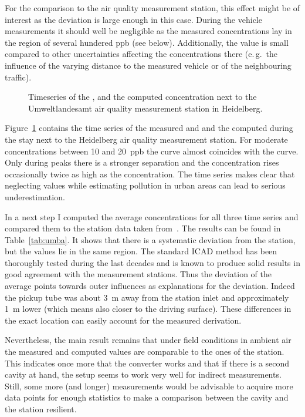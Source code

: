For the comparison to the air quality measurement station, this effect
might be of interest as the deviation is large enough in this
case. During the vehicle measurements it should well be negligible as
the measured concentrations lay in the region of several hundered
\si{ppb} (see below). Additionally, the value is small compared to
other uncertainties affecting the concentrations there (e.\,g.\ the
influence of the varying distance to the measured vehicle or of the
neighbouring traffic).

\begin{figure}[htbp]
  \centering
  
  \caption{Timeseries of the ,  and the computed
     concentration next to the Umweltlandesamt air quality
    measurement station in Heidelberg.}
  \label{fig:umba}
\end{figure}

Figure~\ref{fig:umba} contains the time series of the measured
 and  and the computed  during the stay next
to the Heidelberg air quality measurement station. For moderate
 concentrations between \num{10} and \SI{20}{ppb} the
 curve almost coincides with the  curve. Only during
peaks there is a stronger separation and the  concentration
rises occasionally twice as high as the  concentration. The
time series makes clear that neglecting  values while
estimating  pollution in urban areas can lead to serious
underestimation.

In a next step I computed the average concentrations for all three
time series and compared them to the station data taken
from~\cite{umba}. The results can be found in Table~\ref{tab:umba}. It
shows that there is a systematic deviation from the station, but the
values lie in the same region. The standard ICAD method has been
thoroughly tested during the last decades and is known to produce
solid results in good agreement with the measurement stations. Thus
the deviation of the  average points towards outer influences
as explanations for the deviation. Indeed the pickup tube was about
\SI{3}{\meter} away from the station inlet and approximately
\SI{1}{\meter} lower (which means also closer to the driving
surface). These differences in the exact location can easily account
for the measured derivation.

Nevertheless, the main result remains that under field conditions in
ambient air the measured  and computed 
values are comparable to the ones of the station. This indicates once
more that the converter works and that if there is a second cavity at
hand, the setup seems to work very well for indirect 
measurements. Still, some more (and longer) measurements would be
advisable to acquire more data points for enough statistics to make a
comparison between the cavity and the station resilient.

